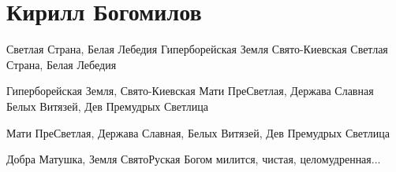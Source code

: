  
 

\section{Кирилл Богомилов}

Светлая Страна, Белая Лебедия
Гиперборейская Земля Свято-Киевская
Светлая Страна, Белая Лебедия

Гиперборейская Земля, Свято-Киевская
Мати ПреСветлая, Держава Славная
Белых Витязей,
Дев Премудрых Светлица

Мати ПреСветлая, Держава Славная,
Белых Витязей, 
Дев Премудрых Светлица

Добра Матушка, Земля СвятоРуская
Богом милится, чистая, целомудренная...


